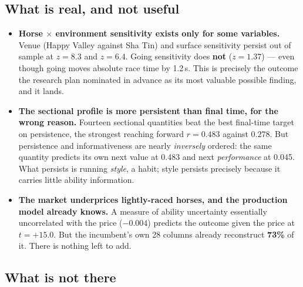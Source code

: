 \documentclass[11pt,a4paper]{article}
\newcommand{\bad}[1]{\textcolor{warm}{\textbf{#1}}}
\begin{document}
\subsection*{What is real, and not useful}

\begin{itemize}\itemsep2pt
\item \textbf{Horse $\times$ environment sensitivity exists only for some
variables.} Venue (Happy Valley against Sha Tin) and surface sensitivity persist
out of sample at $z=8.3$ and $z=6.4$. Going sensitivity does \bad{not}
($z=1.37$) --- even though going moves absolute race time by 1.2\,s. This is
precisely the outcome the research plan nominated in advance as its most valuable
possible finding, and it lands.

\item \textbf{The sectional profile is more persistent than final time, for the
wrong reason.} Fourteen sectional quantities beat the best final-time target on
persistence, the strongest reaching forward $r=0.483$ against $0.278$. But
persistence and informativeness are nearly \emph{inversely} ordered: the same
quantity predicts its own next value at 0.483 and next \emph{performance} at
0.045. What persists is running \emph{style}, a habit; style persists precisely
because it carries little ability information.

\item \textbf{The market underprices lightly-raced horses, and the production
model already knows.} A measure of ability uncertainty essentially uncorrelated
with the price ($-0.004$) predicts the outcome given the price at $t=+15.0$. But
the incumbent's own 28 columns already reconstruct \bad{73\%} of it. There is
nothing left to add.
\end{itemize}

\subsection*{What is not there}
\end{document}
